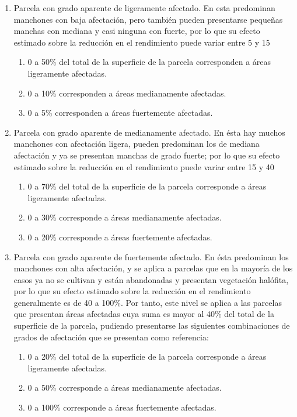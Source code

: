 \begin{enumerate}
  \item Parcela con grado aparente de ligeramente afectado. En esta predominan manchones con baja afectación, pero también pueden presentarse pequeñas manchas con mediana y casi ninguna con fuerte, por lo que su efecto estimado sobre la reducción en el rendimiento puede variar entre 5 y 15%
  \begin{enumerate}
      \item 0 a 50\% del total de la superficie de la parcela corresponden a áreas ligeramente afectadas.
      \item 0 a 10\% corresponden a áreas medianamente afectadas.
      \item 0 a 5\% corresponden a áreas fuertemente afectadas.    
  \end{enumerate}    
  \item Parcela con grado aparente de medianamente afectado. En ésta hay muchos manchones con afectación ligera, pueden predominan los de mediana afectación y ya se presentan manchas de grado fuerte; por lo que su efecto estimado sobre la reducción en el rendimiento puede variar entre 15 y 40%
  \begin{enumerate}
      \item 0 a 70\% del total de la superficie de la parcela corresponde a áreas ligeramente afectadas.
      \item 0 a 30\% corresponde a áreas medianamente afectadas.
      \item 0 a 20\% corresponde a áreas fuertemente afectadas.    
  \end{enumerate}    
  \item Parcela con grado aparente de fuertemente afectado. En ésta predominan los manchones con alta afectación, y se aplica a parcelas que en la mayoría de los casos ya no se cultivan y están abandonadas y presentan vegetación halófita, por lo que su efecto estimado sobre la reducción en el rendimiento generalmente es de 40 a 100\%. Por tanto, este nivel se aplica a las parcelas que presentan áreas afectadas cuya suma es mayor al 40\% del total de la superficie de la parcela, pudiendo presentarse las siguientes combinaciones de grados de afectación que se presentan como referencia:
  \begin{enumerate}
      \item 0 a 20\% del total de la superficie de la parcela corresponde a áreas ligeramente afectadas.
      \item 0 a 50\% corresponde a áreas medianamente afectadas.
      \item 0 a 100\% corresponde a áreas fuertemente afectadas.    
  \end{enumerate}    
\end{enumerate}
